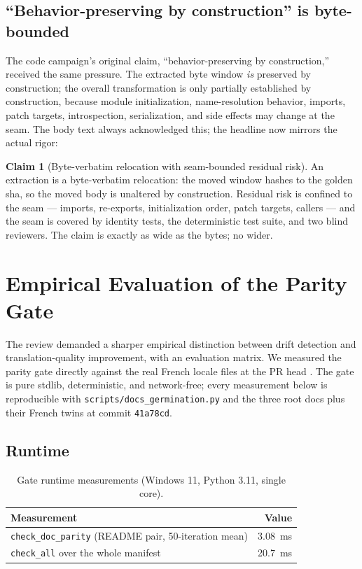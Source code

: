 \documentclass[11pt]{article}
\theoremstyle{definition}
\newtheorem{claim}{Claim}
\theoremstyle{plain}
\theoremstyle{remark}
\begin{document}
\subsection{``Behavior-preserving by construction'' is byte-bounded}

The code campaign's original claim, ``behavior-preserving by construction,''
received the same pressure. The extracted byte window \emph{is} preserved by
construction; the overall transformation is only partially established by
construction, because module initialization, name-resolution behavior,
imports, patch targets, introspection, serialization, and side effects may
change at the seam. The body text always acknowledged this; the headline now
mirrors the actual rigor:

\begin{claim}[Byte-verbatim relocation with seam-bounded residual risk]
\label{cl:byte-bounded}
An extraction is a byte-verbatim relocation: the moved window hashes to the
golden sha, so the moved body is unaltered by construction. Residual risk is
confined to the seam --- imports, re-exports, initialization order, patch
targets, callers --- and the seam is covered by identity tests, the
deterministic test suite, and two blind reviewers. The claim is exactly as
wide as the bytes; no wider.
\end{claim}

\section{Empirical Evaluation of the Parity Gate}
\label{sec:gate-eval}

The review demanded a sharper empirical distinction between drift detection
and translation-quality improvement, with an evaluation matrix. We measured
the parity gate directly against the real French locale files at the PR head
\citep{hermespr80391}. The gate is pure stdlib, deterministic, and
network-free; every measurement below is reproducible with
\texttt{scripts/docs\_germination.py} and the three root docs plus their
French twins at commit \texttt{41a78cd}.

\subsection{Runtime}

\begin{table}[H]
\centering
\caption{Gate runtime measurements (Windows 11, Python 3.11, single core).}
\label{tab:runtime}
\begin{tabular}{lr}
\toprule
Measurement & Value \\
\midrule
\texttt{check\_doc\_parity} (README pair, 50-iteration mean) & 3.08~ms \\
\texttt{check\_all} over the whole manifest & 20.7~ms \\
\bottomrule
\end{tabular}
\end{table}
\end{document}
